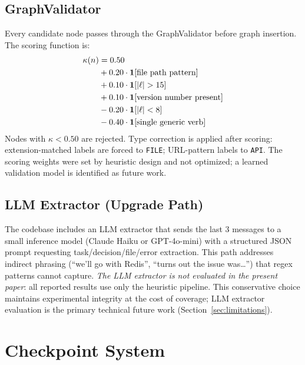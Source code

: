 \documentclass[journal]{IEEEtran}
\begin{document}
\subsection{GraphValidator}

Every candidate node passes through the GraphValidator before
graph insertion.
The scoring function is:
\begin{align}
  \kappa(n) &= 0.50 \notag \\
             &+ 0.20 \cdot \mathbf{1}[\text{file path pattern}] \notag \\
             &+ 0.10 \cdot \mathbf{1}[|\ell| > 15] \notag \\
             &+ 0.10 \cdot \mathbf{1}[\text{version number present}] \notag \\
             &- 0.20 \cdot \mathbf{1}[|\ell| < 8] \notag \\
             &- 0.40 \cdot \mathbf{1}[\text{single generic verb}]
  \label{eq:confidence}
\end{align}
Nodes with $\kappa < 0.50$ are rejected.
Type correction is applied after scoring: extension-matched
labels are forced to \texttt{FILE}; URL-pattern labels to
\texttt{API}.
The scoring weights were set by heuristic design and not
optimized; a learned validation model is identified as
future work.

\subsection{LLM Extractor (Upgrade Path)}

The codebase includes an LLM extractor that sends the last
3 messages to a small inference model (Claude Haiku or
GPT-4o-mini) with a structured JSON prompt requesting
task/decision/file/error extraction.
This path addresses indirect phrasing
(``we'll go with Redis'', ``turns out the issue was\ldots'')
that regex patterns cannot capture.
\textit{The LLM extractor is not evaluated in the present
paper}: all reported results use only the heuristic pipeline.
This conservative choice maintains experimental integrity
at the cost of coverage; LLM extractor evaluation is the
primary technical future work (Section~\ref{sec:limitations}).

\section{Checkpoint System}
\label{sec:checkpoint}
\end{document}
